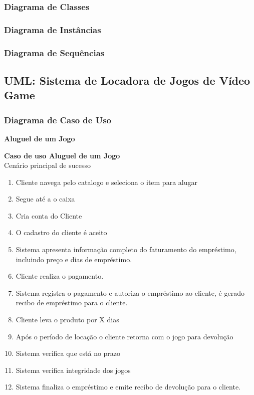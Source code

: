 \documentclass[a4paper,10pt]{article}
\begin{document}
\subsubsection{Diagrama de Classes}
\subsubsection{Diagrama de Instâncias}
\subsubsection{Diagrama de Sequências}

\subsection{UML: Sistema de Locadora de Jogos de Vídeo Game}

\subsubsection{Diagrama de Caso de Uso}

\textbf{Aluguel de um Jogo}

\textbf{Caso de uso Aluguel de um Jogo}\\
Cenário principal de sucesso

\begin{enumerate}
\item 	Cliente navega pelo catalogo e seleciona o item para alugar
\item 	Segue até a o caixa
\item 	Cria conta do Cliente \label{enum:novoCliente}
\item 	O cadastro do cliente é aceito
\item 	Sistema apresenta informação completo do faturamento do empréstimo, incluindo preço e dias de empréstimo. \label{enum:finaliza}
\item 	Cliente realiza o pagamento.
\item 	Sistema registra o pagamento e autoriza o empréstimo ao cliente, é gerado recibo de empréstimo para o cliente. 
\item 	Cliente leva o produto por X dias
\item 	Após o período de locação o cliente retorna com o jogo para devolução
\item 	Sistema verifica que está no prazo \label{enum:atraso}
\item 	Sistema verifica integridade dos jogos \label{enum:dano}
\item 	Sistema finaliza o empréstimo e emite recibo de devolução para o cliente.
\end{enumerate}
\end{document}
